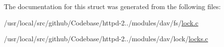 The documentation for this struct was generated from the following files\+:\begin{DoxyCompactItemize}
\item 
/usr/local/src/github/\+Codebase/httpd-\/2../modules/dav/fs/\hyperlink{lock_8c}{lock.\+c}\item 
/usr/local/src/github/\+Codebase/httpd-\/2../modules/dav/lock/\hyperlink{locks_8c}{locks.\+c}\end{DoxyCompactItemize}

